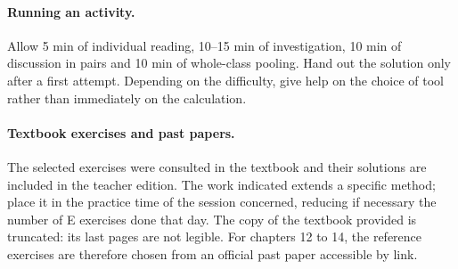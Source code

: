 \paragraph{Running an activity.} Allow 5 min of individual reading, 10--15 min of investigation, 10 min of discussion in pairs and 10 min of whole-class pooling. Hand out the solution only after a first attempt. Depending on the difficulty, give help on the choice of tool rather than immediately on the calculation.
\paragraph{Textbook exercises and past papers.} The selected exercises were consulted in the textbook and their solutions are included in the teacher edition. The work indicated extends a specific method; place it in the practice time of the session concerned, reducing if necessary the number of E exercises done that day. The copy of the textbook provided is truncated: its last pages are not legible. For chapters 12 to 14, the reference exercises are therefore chosen from an official past paper accessible by link.
